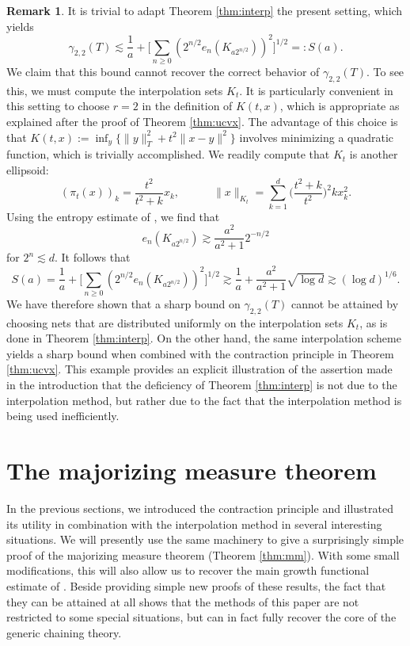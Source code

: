 \documentclass[10pt,reqno]{amsart}
\theoremstyle{definition}
\newtheorem{rem}[thm]{Remark}
\numberwithin{equation}{section}
\numberwithin{figure}{section}
\numberwithin{table}{section}
\begin{document}
\begin{rem}
It is trivial to adapt Theorem \ref{thm:interp} the present setting, which 
yields
$$
	\gamma_{2,2}(T) \lesssim
	\frac{1}{a} +
	\Bigg[
	\sum_{n\ge 0} (2^{n/2}e_n(K_{a2^{n/2}}))^2
	\Bigg]^{1/2} =: S(a).
$$
We claim that this bound cannot recover the correct behavior
of $\gamma_{2,2}(T)$. To see this, we must compute the interpolation sets 
$K_t$. It is particularly convenient in this setting to choose $r=2$ in the 
definition of $K(t,x)$, which is appropriate as explained after the proof 
of Theorem \ref{thm:ucvx}. The advantage of this choice is that 
$K(t,x):=\inf_y\{\|y\|_T^2+t^2\|x-y\|^2\}$ involves minimizing a 
quadratic function, which is trivially accomplished. We readily compute
that $K_t$ is another ellipsoid:
$$
	(\pi_t(x))_k = \frac{t^2}{t^2+k} x_k,\qquad\quad
	\|x\|_{K_t} =	\sum_{k=1}^d \bigg(
	\frac{t^2+k}{t^2}
	\bigg)^2 kx_k^2.
$$
Using the entropy estimate of \cite[Lemma 2.5.4]{Tal14}, we find that
$$
	e_n(K_{a2^{n/2}}) 
	\gtrsim
        \frac{a^2}{a^2+1} 2^{-n/2}
$$
for $2^n\lesssim d$.  It follows that
$$
	S(a) = \frac{1}{a} +
	\Bigg[
	\sum_{n\ge 0} (2^{n/2}e_n(K_{a2^{n/2}}))^2
	\Bigg]^{1/2} \gtrsim
	\frac{1}{a} +
	\frac{a^2}{a^2+1}\sqrt{\log d}
	\gtrsim (\log d)^{1/6}.
$$
We have therefore shown that a sharp bound on $\gamma_{2,2}(T)$ cannot be 
attained by choosing nets that are distributed uniformly on the 
interpolation sets $K_t$, as is done in Theorem \ref{thm:interp}. On the 
other hand, the same interpolation scheme yields a sharp bound when 
combined with the contraction principle in Theorem \ref{thm:ucvx}. This 
example provides an explicit illustration of the assertion made in the 
introduction that the deficiency of Theorem \ref{thm:interp} is not due to 
the interpolation method, but rather due to the fact that the 
interpolation method is being used inefficiently.
\end{rem}


\section{The majorizing measure theorem}
\label{sec:mm}

In the previous sections, we introduced the contraction principle and 
illustrated its utility in combination with the interpolation method in 
several interesting situations. We 
will presently use the same machinery to give a surprisingly simple proof 
of the majorizing measure theorem (Theorem \ref{thm:mm}). With some small 
modifications, this will also allow us to recover the main growth 
functional estimate of \cite{Tal14}. Beside providing simple new proofs of 
these results, the fact that they can be attained at all shows that the 
methods of this paper are not restricted to some special situations, but 
can in fact fully recover the core of the generic chaining theory. 
\end{document}
